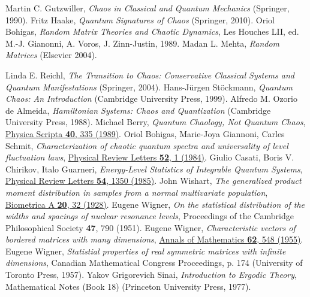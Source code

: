 \documentclass[a4paper,11pt,twoside]{article}
\begin{document}
\begin{thebibliography}{99}
     Martin C. Gutzwiller, {\it Chaos in Classical and Quantum Mechanics} (Springer, 1990).
     Fritz Haake, {\it Quantum Signatures of Chaos} (Springer, 2010).
     Oriol Bohigas, {\it Random Matrix Theories and Chaotic Dynamics}, Les Houches LII, ed. M.-J. Gianonni, A. Voros, J. Zinn-Justin, 1989.
     Madan L. Mehta, {\it Random Matrices} (Elsevier 2004).

     Linda E. Reichl, {\it The Transition to Chaos: Conservative Classical Systems and Quantum Manifestations} (Springer, 2004).
     Hans-Jürgen Stöckmann, {\it Quantum Chaos: An Introduction} (Cambridge University Press, 1999).
     Alfredo M. Ozorio de Almeida, {\it Hamiltonian Systems: Chaos and Quantization} (Cambridge University Press, 1988).
     Michael Berry, {\it Quantum Chaology, Not Quantum Chaos}, \href{https://iopscience.iop.org/article/10.1088/0031-8949/40/3/013}{Physica Scripta {\bf 40}, 335 (1989)}.
     Oriol Bohigas, Marie-Joya Giannoni, Carles Schmit, {\it Characterization of chaotic quantum spectra and universality of level fluctuation laws}, \href{https://journals.aps.org/prl/abstract/10.1103/PhysRevLett.52.1
    }{Physical Review Letters {\bf 52}, 1 (1984)}.
     Giulio Casati, Boris V. Chirikov, Italo Guarneri, {\it Energy-Level Statistics of Integrable Quantum Systems}, \href{https://journals.aps.org/prl/abstract/10.1103/PhysRevLett.54.1350}{Physical Review Letters {\bf 54}, 1350 (1985)}.
     John Wishart, {\it The generalized product moment distribution in samples from a normal multivariate population}, \href{https://academic.oup.com/biomet/article-abstract/20A/1-2/32/204365}{Biometrica A {\bf 20}, 32 (1928)}.
     Eugene Wigner, {\it On the statistical distribution of the widths and spacings of nuclear resonance levels}, Proceedings of the Cambridge Philosophical Society {\bf 47}, 790 (1951).
     Eugene Wigner, {\it Characteristic vectors of bordered matrices with many dimensions}, \href{https://www.jstor.org/stable/1970079}{Annals of Mathematics {\bf 62}, 548 (1955)}.
     Eugene Wigner, {\it Statistial properties of real symmetric matrices with infinite dimensions}, Canadian Mathematical Congress Proceedings, p. 174 (University of Toronto Press, 1957).
     Yakov Grigorevich Sinai, {\it Introduction to Ergodic Theory}, Mathematical Notes (Book 18) (Princeton University Press, 1977).

\end{thebibliography}
\end{document}
